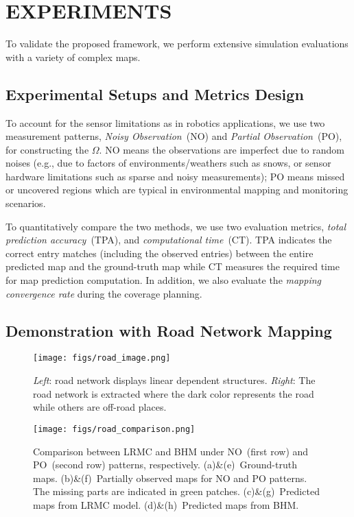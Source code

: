 \section{EXPERIMENTS}

To validate the proposed framework, we perform extensive simulation evaluations with a variety of complex maps. 

\subsection{Experimental Setups and Metrics Design}

To account for the sensor limitations as in robotics applications, we use two measurement patterns, \textit{Noisy Observation}~(NO) and \textit{Partial Observation}~(PO), for constructing the $\Omega$. NO means the observations are imperfect due to random noises (e.g., due to factors of environments/weathers such as snows, or sensor hardware limitations such as sparse and noisy measurements); 
PO means missed or uncovered regions which are typical in environmental mapping and monitoring scenarios. 

To quantitatively compare the two methods,  we use two evaluation metrics, \textit{total prediction accuracy}~(TPA), and \textit{computational time}~(CT). TPA indicates the correct entry matches (including the observed entries) between the entire predicted map and the ground-truth map while CT measures the required time for map prediction computation. 
In addition, we also evaluate the \textit{mapping convergence rate} during the coverage planning.


\subsection{Demonstration with Road Network Mapping}
\begin{figure}
  \centering
  	{\label{fig:road_image}\texttt{[image: figs/road\_image.png]}}
  \caption{\small \textit{Left}: road network displays linear dependent structures.  \textit{Right}: The road network is extracted where 
  the dark color represents the road while others are off-road places.
  } 
\label{fig:road_image}  
\end{figure}

\begin{figure} %
  \centering
  	{\label{fig:road_comparison}\texttt{[image: figs/road\_comparison.png]}}
  \caption{\small Comparison between LRMC and BHM under NO~(first row) and PO~(second row) patterns, respectively. (a)\&(e)~Ground-truth maps. (b)\&(f)~Partially observed maps for NO and PO patterns. The missing parts are indicated in green patches. (c)\&(g)~Predicted maps from LRMC model. (d)\&(h)~Predicted maps from BHM.
  } \vspace{-10pt}
\label{fig:road_comparison}  
\end{figure}



